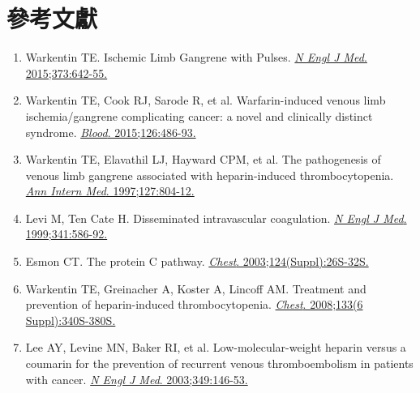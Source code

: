 \documentclass[12pt,a4paper]{article}
\begin{document}
\section{參考文獻}

\begin{enumerate}
    \item Warkentin TE. Ischemic Limb Gangrene with Pulses. \href{https://doi.org/10.1056/NEJMra1316259}{\textit{N Engl J Med}. 2015;373:642-55.}

    \item Warkentin TE, Cook RJ, Sarode R, et al. Warfarin-induced venous limb ischemia/gangrene complicating cancer: a novel and clinically distinct syndrome. \href{https://doi.org/10.1182/blood-2015-01-622563}{\textit{Blood}. 2015;126:486-93.}

    \item Warkentin TE, Elavathil LJ, Hayward CPM, et al. The pathogenesis of venous limb gangrene associated with heparin-induced thrombocytopenia. \href{https://doi.org/10.7326/0003-4819-127-9-199711010-00005}{\textit{Ann Intern Med}. 1997;127:804-12.}

    \item Levi M, Ten Cate H. Disseminated intravascular coagulation. \href{https://doi.org/10.1056/NEJM199908193410807}{\textit{N Engl J Med}. 1999;341:586-92.}

    \item Esmon CT. The protein C pathway. \href{https://doi.org/10.1378/chest.124.3_suppl.26S}{\textit{Chest}. 2003;124(Suppl):26S-32S.}

    \item Warkentin TE, Greinacher A, Koster A, Lincoff AM. Treatment and prevention of heparin-induced thrombocytopenia. \href{https://doi.org/10.1378/chest.08-0677}{\textit{Chest}. 2008;133(6 Suppl):340S-380S.}

    \item Lee AY, Levine MN, Baker RI, et al. Low-molecular-weight heparin versus a coumarin for the prevention of recurrent venous thromboembolism in patients with cancer. \href{https://doi.org/10.1056/NEJMoa025313}{\textit{N Engl J Med}. 2003;349:146-53.}
\end{enumerate}
\end{document}
